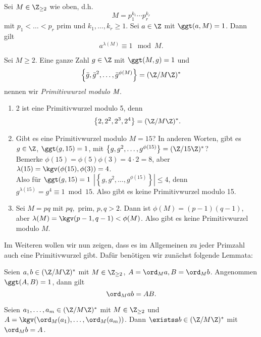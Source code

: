 \begin{thm}\autolabel
	Sei $M \in \Z_{\geq 2}$ wie oben, d.h.
	\[ M = p_1^{k_1} \dotsm p_r^{k_r} \]
	mit $p_1 < \dots < p_r$ prim und $k_1, \dotsc, k_r \geq 1$. Sei $a \in \Z$ mit $\ggt(a,M)=1$. Dann gilt
	\[ a^{\lambda(M)} \equiv 1 \mod M. \]
\end{thm}

\begin{defn*}[Primitivwurzel]
	Sei $M \geq 2$. Eine ganze Zahl $g \in \Z$ mit $\ggt(M,g)=1$ und 
	\[ \left\{ \bar{g}, \bar{g}^2,\dotsc, \bar{g}^{\phi(M)} \right\} = (\Z/M\Z)^* \]
	nennen wir \emph{Primitivwurzel modulo $\emph{M}$}.
\end{defn*}

\begin{exmp*}
	\begin{enumerate}
		\item 2 ist eine Primitivwurzel modulo 5, denn
		\[ \left\{2,2^2,2^3,2^4 \right\} = (\Z/M\Z)^*. \]
		\item Gibt es eine Primitivwurzel modulo $M=15$? In anderen Worten, gibt es $g \in \Z$, $\ggt(g,15)=1$, mit $\left\{ g,g^2,\dotsc,g^{\phi(15)} \right\} = (\Z/15\Z)^*$?\\
			Bemerke $\phi(15) = \phi(5)\phi(3) = 4 \cdot 2 = 8$, aber $\lambda(15) = \kgv(\phi(15),\phi(3)) = 4$.\\
			Also für $\ggt(g,15) = 1$ $\left|\left\{ g,g^2,\dotsc, g^{\phi(15)} \right\}\right| \leq 4$, denn $g^{\lambda(15)} = g^4 \equiv 1 \bmod 15$. Also gibt es keine Primitivwurzel modulo 15.
		\item Sei $M = pq$ mit $pq,$ prim, $p,q > 2$. Dann ist $\phi(M) = (p-1)(q-1)$, aber $\lambda(M) = \kgv(p-1,q-1) < \phi(M)$. Also gibt es keine Primitivwurzel modulo $M$.
	\end{enumerate}
\end{exmp*}

Im Weiteren wollen wir nun zeigen, dass es im Allgemeinen zu jeder Primzahl auch eine Primitivwurzel gibt. Dafür benötigen wir zunächst folgende Lemmata:

\begin{lem}\autolabel
	Seien $a,b \in (\Z/M\Z)^*$ mit $M \in \Z_{\geq 2}$, $A = \ord_M a, B = \ord_M b$. Angenommen $\ggt(A,B)=1$, dann gilt
	\[ \ord_M ab = AB. \]
\end{lem}

\begin{lem}\autolabel
	Seien $a_1,\dotsc,a_m \in (\Z/M\Z)^*$ mit $M \in \Z_{\geq 2}$ und $A = \kgv(\ord_M(a_1),\dotsc, \ord_M(a_m))$. Dann $\existss b \in (\Z/M\Z)^*$ mit $\ord_M b = A$.
\end{lem}

